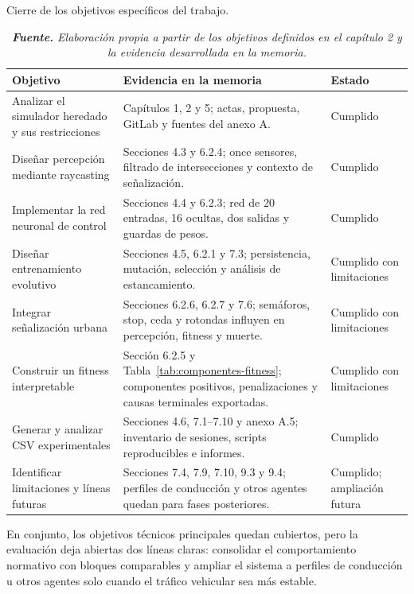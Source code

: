 \begin{table}[H]
\centering
\caption{Cierre de los objetivos específicos del trabajo.}%
\label{tab:cierre-objetivos}
\footnotesize
\begin{tabularx}{0.98\textwidth}{L{4.2cm}>{\raggedright\arraybackslash}X L{2.7cm}}
\toprule
\textbf{Objetivo} & \textbf{Evidencia en la memoria} & \textbf{Estado}\\
\midrule
Analizar el simulador heredado y sus restricciones & Capítulos 1, 2 y 5; actas, propuesta, GitLab y fuentes del anexo A. & Cumplido\\
Diseñar percepción mediante raycasting & Secciones 4.3 y 6.2.4; once sensores, filtrado de intersecciones y contexto de señalización. & Cumplido\\
Implementar la red neuronal de control & Secciones 4.4 y 6.2.3; red de 20 entradas, 16 ocultas, dos salidas y guardas de pesos. & Cumplido\\
Diseñar entrenamiento evolutivo & Secciones 4.5, 6.2.1 y 7.3; persistencia, mutación, selección y análisis de estancamiento. & Cumplido con limitaciones\\
Integrar señalización urbana & Secciones 6.2.6, 6.2.7 y 7.6; semáforos, stop, ceda y rotondas influyen en percepción, fitness y muerte. & Cumplido con limitaciones\\
Construir un fitness interpretable & Sección 6.2.5 y Tabla~\ref{tab:componentes-fitness}; componentes positivos, penalizaciones y causas terminales exportadas. & Cumplido con limitaciones\\
Generar y analizar CSV experimentales & Secciones 4.6, 7.1--7.10 y anexo A.5; inventario de sesiones, scripts reproducibles e informes. & Cumplido\\
Identificar limitaciones y líneas futuras & Secciones 7.4, 7.9, 7.10, 9.3 y 9.4; perfiles de conducción y otros agentes quedan para fases posteriores. & Cumplido; ampliación futura\\
\bottomrule
\end{tabularx}
\caption*{\textit{\textbf{Fuente.} Elaboración propia a partir de los objetivos definidos en el capítulo 2 y la evidencia desarrollada en la memoria.}}
\end{table}

En conjunto, los objetivos técnicos principales quedan cubiertos, pero la evaluación deja abiertas dos líneas claras: consolidar el comportamiento normativo con bloques comparables y ampliar el sistema a perfiles de conducción u otros agentes solo cuando el tráfico vehicular sea más estable.

